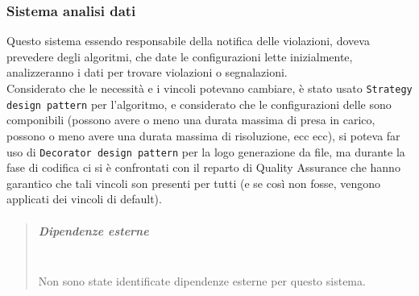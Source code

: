         \subsubsection{Sistema analisi dati}
            Questo sistema essendo responsabile della notifica delle violazioni, doveva prevedere degli algoritmi, che date le configurazioni lette inizialmente, analizzeranno i dati per trovare violazioni o segnalazioni. \\
            Considerato che le necessità e i vincoli potevano cambiare, è stato usato \texttt{Strategy design pattern} per l'algoritmo, e considerato che le configurazioni delle  sono componibili (possono avere o meno una durata massima di presa in carico, possono o meno avere una durata massima di risoluzione, ecc ecc), si poteva far uso di \texttt{Decorator design pattern} per la logo generazione da file, ma durante la fase di codifica ci si è confrontati con il reparto di Quality Assurance che hanno garantico che tali vincoli son presenti per tutti (e se così non fosse, vengono applicati dei vincoli di default).
            \begin{quote}
            	\mbox{}%
            	\vspace{-1cm}
                    \subparagraph{Dipendenze esterne}
                    \mbox{} \\
                        Non sono state identificate dipendenze esterne per questo sistema.
            \end{quote}
